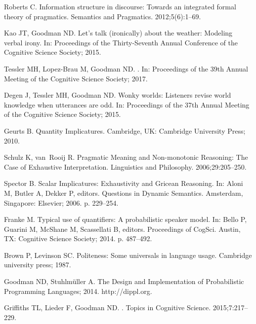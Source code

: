 \documentclass[10pt,letterpaper]{article}
\def\url#1{\expandafter\string\csname #1\endcsname}
\begin{document}
\begin{thebibliography}{10}
Roberts C.
\newblock Information structure in discourse: Towards an integrated formal
  theory of pragmatics.
\newblock Semantics and Pragmatics. 2012;5(6):1--69.

Kao JT, Goodman ND.
\newblock Let's talk (ironically) about the weather: Modeling verbal irony.
\newblock In: Proceedings of the Thirty-Seventh Annual Conference of the
  {C}ognitive {S}cience {S}ociety; 2015.

Tessler MH, Lopez-Brau M, Goodman ND.
.
\newblock In: Proceedings of the 39th Annual Meeting of the {C}ognitive
  {S}cience {S}ociety; 2017.

Degen J, Tessler MH, Goodman ND.
\newblock Wonky worlds: Listeners revise world knowledge when utterances are
  odd.
\newblock In: Proceedings of the 37th Annual Meeting of the {C}ognitive
  {S}cience {S}ociety; 2015.

Geurts B.
\newblock Quantity Implicatures.
\newblock Cambridge, UK: Cambridge University Press; 2010.

Schulz K, van~Rooij R.
\newblock Pragmatic Meaning and Non-monotonic Reasoning: The Case of Exhaustive
  Interpretation.
\newblock Linguistics and Philosophy. 2006;29:205--250.

Spector B.
\newblock Scalar Implicatures: Exhaustivity and Gricean Reasoning.
\newblock In: Aloni M, Butler A, Dekker P, editors. Questions in Dynamic
  Semantics. Amsterdam, Singapore: Elsevier; 2006. p. 229--254.

Franke M.
\newblock Typical use of quantifiers: {A} probabilistic speaker model.
\newblock In: Bello P, Guarini M, McShane M, Scassellati B, editors.
  Proceedings of CogSci. Austin, TX: Cognitive Science Society; 2014. p.
  487--492.

Brown P, Levinson SC.
\newblock Politeness: Some universals in language usage.
\newblock Cambridge university press; 1987.

Goodman ND, Stuhlm\"{u}ller A. The Design and Implementation of Probabilistic
  Programming Languages; 2014.
\newblock \url{http://dippl.org}.

Griffiths TL, Lieder F, Goodman ND.
.
\newblock Topics in Cognitive Science. 2015;7:217--229.


\end{thebibliography}
\end{document}
